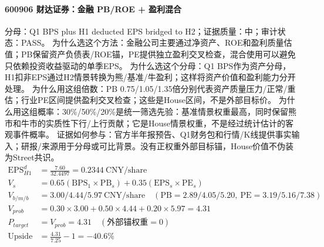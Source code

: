 \paragraph{600906 财达证券：金融 PB/ROE + 盈利混合}
分母：Q1 BPS plus H1 deducted EPS bridged to H2；证据质量：中；审计状态：PASS。
为什么选这个方法：金融公司主要通过净资产、ROE和盈利质量估值；PB保留资产负债表/ROE锚，PE提供独立盈利交叉检查，混合使用可以避免只依赖投资收益驱动的单季EPS。
为什么选这个分母：Q1 BPS作为资产分母，H1扣非EPS通过H2情景转换为熊/基准/牛盈利；这样将资产价值和盈利能力分开处理。
为什么用这组倍数：PB 0.75/1.05/1.35倍分别代表资产质量压力/正常/重估；行业PE区间提供盈利交叉检查；这些是House区间，不是外部目标价。
为什么用这组概率：30\%/50\%/20\%是统一筛选先验：基准情景权重最高，同时保留熊市和牛市的实质性下行/上行贡献；它是House情景权重，不是经过统计估计的客观事件概率。
证据如何参与：官方半年报预告、Q1财务包和行情/K线提供事实输入；研报/来源用于分母或可比背景。没有正权重外部目标锚，House价值不伪装为Street共识。
\begin{align*}
\mathrm{EPS}_{H1}^d &= \frac{7.60}{32.4497} = 0.2344\ \mathrm{CNY/share}\\
V_s &= 0.65\left(\mathrm{BPS}_1\times \mathrm{PB}_s\right)+0.35\left(\mathrm{EPS}_s\times \mathrm{PE}_s\right)\\
V_{b/m/b} &= 3.00/4.44/5.97\ \mathrm{CNY/share}\quad(\mathrm{PB}=2.89/4.05/5.20,\ \mathrm{PE}=3.19/5.16/7.38)\\
V_{prob} &= 0.30\times 3.00+0.50\times 4.44+0.20\times 5.97=4.31\\
P_{target} &= V_{prob}=4.31\quad(\text{外部锚权重}=0)\\
\mathrm{Upside} &= \frac{4.31}{7.25}-1=-40.6\%\\
\end{align*}

